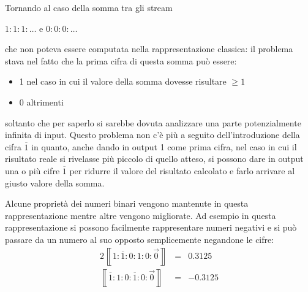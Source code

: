 \documentclass[Lau]{sapthesis}
\begin{document}
Tornando al caso della somma tra gli stream
\begin{center}
$1:1:1:\ldots$ \hspace{0.5cm} e \hspace{0.5cm} $0:0:0:\ldots$
\end{center}
che non poteva essere computata nella rappresentazione classica: il problema stava nel fatto che la prima cifra di questa somma può essere:
\begin{itemize}
\item 1 nel caso in cui il valore della somma dovesse risultare $\geq1$
\item 0 altrimenti
\end{itemize}
soltanto che per saperlo si sarebbe dovuta analizzare una parte potenzialmente infinita di input. Questo problema non c'è più a seguito dell'introduzione della cifra $\overline{1}$ in quanto, anche dando in output 1 come prima cifra, nel caso in cui il risultato reale si rivelasse più piccolo di quello atteso, si possono dare in output una o più cifre $\overline{1}$ per ridurre il valore del risultato calcolato e farlo arrivare al giusto valore della somma.

Alcune proprietà dei numeri binari vengono mantenute in questa rappresentazione mentre altre vengono migliorate. Ad esempio in questa rappresentazione si possono facilmente rappresentare numeri negativi e si può passare da un numero al suo opposto semplicemente negandone le cifre:
\begin{alignat*}{2}
\left\llbracket 1:\overline{1}:0:1:0:\overrightarrow{0} \right\rrbracket &{} = {}& 0.3125\\
\left\llbracket \overline{1}:1:0:\overline{1}:0:\overrightarrow{0} \right\rrbracket &{} = {}& -0.3125
\end{alignat*}
\end{document}
